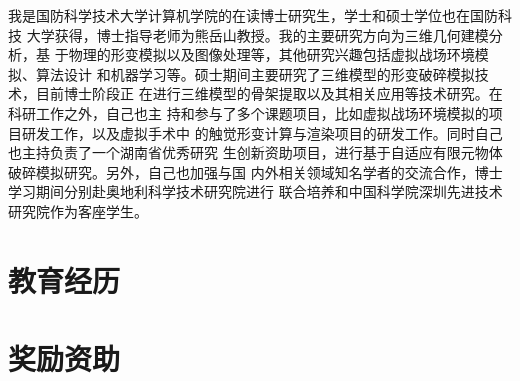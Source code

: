 \documentclass[20pt]{article} %
\begin{document}
\begin{flushleft}
我是国防科学技术大学计算机学院的在读博士研究生，学士和硕士学位也在国防科技
大学获得，博士指导老师为熊岳山教授。我的主要研究方向为三维几何建模分析，基
于物理的形变模拟以及图像处理等，其他研究兴趣包括虚拟战场环境模拟、算法设计
和机器学习等。硕士期间主要研究了三维模型的形变破碎模拟技术，目前博士阶段正
在进行三维模型的骨架提取以及其相关应用等技术研究。在科研工作之外，自己也主
持和参与了多个课题项目，比如虚拟战场环境模拟的项目研发工作，以及虚拟手术中
的触觉形变计算与渲染项目的研发工作。同时自己也主持负责了一个湖南省优秀研究
生创新资助项目，进行基于自适应有限元物体破碎模拟研究。另外，自己也加强与国
内外相关领域知名学者的交流合作，博士学习期间分别赴奥地利科学技术研究院进行
联合培养和中国科学院深圳先进技术研究院作为客座学生。
\end{flushleft}

\section{教育经历}

\section{奖励资助}
\end{document}
